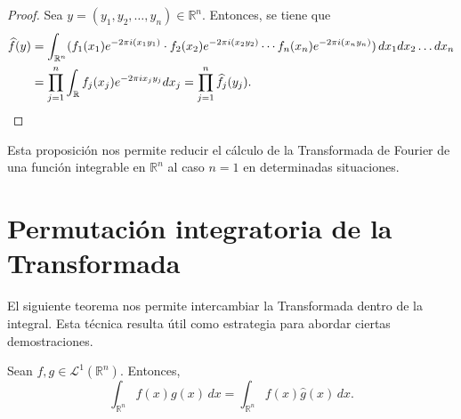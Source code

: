 \begin{proof}
Sea $y = (y_1,y_2, \ldots, y_n) \in \mathbb{R}^n$. Entonces, se tiene que
\begin{equation*}
\begin{split}
    \widehat{f}(y) &= \int_{\mathbb{R}^n} (f_1(x_1)e^{-2\pi i (x_1y_1)} \cdot f_2(x_2)e^{-2\pi i (x_2y_2)} \cdots f_n(x_n)e^{-2\pi i (x_ny_n)} )  \, dx_1dx_2\ldots dx_n \\
    &= \prod_{j=1}^{n}\int_{\mathbb{R}}f_j(x_j)e^{-2\pi i x_j y_j} dx_j =  \prod_{j=1}^{n}\widehat{f_j}(y_j) . \qedhere
\end{split}
\end{equation*}

\end{proof}
\begin{observacion}
    Esta proposición nos permite reducir el cálculo de la Transformada de Fourier de una función integrable en $\mathbb{R}^n$ al caso $n=1$ en determinadas situaciones.
\end{observacion}



\section{Permutación integratoria de la Transformada}
El siguiente teorema nos permite intercambiar la Transformada dentro de la integral. Esta técnica resulta útil como estrategia para abordar ciertas demostraciones.
\begin{teorema}\label{teo:cambio}
    Sean $f,g \in \mathscr{L}^1(\mathbb{R}^n)$. Entonces,
    \begin{equation}
        \int_{\mathbb{R}^n} \widehat{f}(x)g(x) \, dx =  \int_{\mathbb{R}^n} f(x) \widehat{g}(x) \, dx.
    \end{equation}
\end{teorema}

